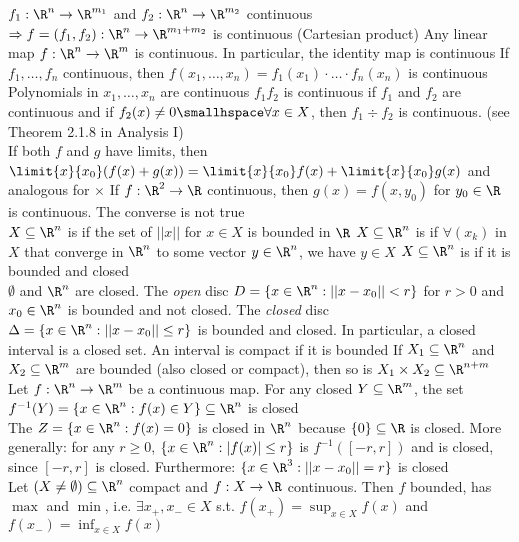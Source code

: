 \shortex {} $f_1 : \R^n \rightarrow \R^{m_1}$ and $f_2 : \R^n \rightarrow \R^{m_2}$ continuous
$\Rightarrow f = (f_1, f_2): \R^n \rightarrow \R^{m_1 + m_2}$ is continuous (Cartesian product)
 Any linear map $f: \R^n \rightarrow \R^m$ is continuous. In particular, the identity map is continuous
 If $f_1, \ldots, f_n$ continuous, then $f(x_1, \ldots, x_n) = f_1(x_1) \cdot \ldots \cdot f_n(x_n)$ is continuous
 Polynomials in $x_1, \ldots, x_n$ are continuous
 $f_1f_2$ is continuous if $f_1$ and $f_2$ are continuous and if $f_2(x) \neq 0 \smallhspace \forall x \in X$, then $f_1 \div f_2$ is continuous.
(see Theorem 2.1.8 in Analysis I)\\
 If both $f$ and $g$ have limits, then $\displaystyle \limit{x}{x_0}(f(x) + g(x)) = \limit{x}{x_0} f(x) + \limit{x}{x_0} g(x)$ and analogous for $\times$
 If $f: \R^2 \rightarrow \R$ continuous, then $g(x) = f(x, y_0)$ for $y_0 \in \R$ is continuous. The converse is not true\\
\shortdef {} $X \subseteq \R^n$ is  if the set of $||x||$ for $x \in X$ is bounded in $\R$
 $X \subseteq \R^n$ is  if $\forall (x_k)$ in $X$ that converge in $\R^n$ to some vector $y \in \R^n$, we have $y \in X$
 $X \subseteq \R^n$ is  if it is bounded and closed\\
\shortex {} $\emptyset$ and $\R^n$ are closed.
 The \textit{open} disc $D = \{ x \in \R^n : ||x - x_0|| < r \}$ for $r > 0$ and $x_0 \in \R^n$ is bounded and not closed.
 The \textit{closed} disc $\Delta = \{ x \in \R^n : ||x - x_0|| \leq r \}$ is bounded and closed. In particular, a closed interval is a closed set.
An interval is compact if it is bounded
 If $X_1 \subseteq \R^n$ and $X_2 \subseteq \R^m$ are bounded (also closed or compact), then so is $X_1 \times X_2 \subseteq \R^{n + m}$\\
\shortproposition Let $f: \R^n \rightarrow \R^m$ be a continuous map. For any closed $Y \subseteq \R^m$,
the set $f^{-1}(Y) = \{ x \in \R^n : f(x) \in Y \} \subseteq \R^n$ is closed\\
\shortex The  $Z = \{ x\in \R^n : f(x) = 0 \}$ is closed in $\R^n$ because $\{ 0 \} \subseteq \R$ is closed.
More generally: for any $r \geq 0$, $\{ x \in \R^n : |f(x)| \leq r \}$ is $f^{-1}([-r, r])$ and is closed, since $[-r, r]$ is closed.
Furthermore: $\{ x\in \R^3 : ||x - x_0|| = r \}$ is closed\\
\shorttheorem Let $(X \neq \emptyset) \subseteq \R^n$ compact and $f: X \rightarrow \R$ continuous. 
Then $f$ bounded, has $\max$ and $\min$, i.e. $\exists x_+, x_- \in X$ s.t. $\displaystyle f(x_+) = \sup_{x \in X} f(x)$ and $\displaystyle f(x_-) = \inf_{x \in X} f(x)$
